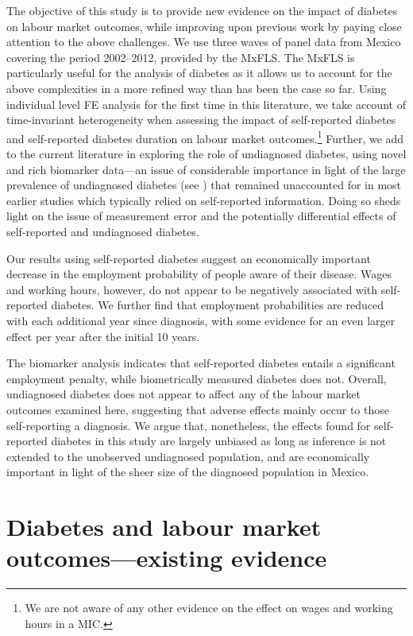 The objective of this study is to provide new evidence on the impact of diabetes on labour market outcomes, while improving upon previous work by paying close attention to the above challenges. We use three waves of panel data from Mexico covering the period 2002--2012, provided by the \acf{MxFLS}. The \ac{MxFLS} is particularly useful for the analysis of diabetes as it allows us to account for the above complexities in a more refined way than has been the case so far. Using individual level \ac{FE} analysis for the first time in this literature, we take account of time-invariant heterogeneity when assessing the impact of self-reported diabetes and self-reported diabetes duration on labour market outcomes.\footnote{We are not aware of any other evidence on the effect on wages and working hours in a \ac{MIC}.} Further, we add to the current literature in exploring the role of undiagnosed diabetes, using novel and rich biomarker data---an issue of considerable importance in light of the large prevalence of undiagnosed diabetes (see \textcite{Beagley2014}) that remained unaccounted for in most earlier studies which typically relied on self-reported information. Doing so sheds light on the issue of measurement error and the potentially differential effects of self-reported and undiagnosed diabetes. 

Our results using self-reported diabetes suggest an economically important decrease in the employment probability of people aware of their disease. Wages and working hours, however, do not appear to be negatively associated with self-reported diabetes. We further find that employment probabilities are reduced with each additional year since diagnosis, with some evidence for an even larger effect per year after the initial 10 years. 

The biomarker analysis indicates that self-reported diabetes entails a significant employment penalty, while biometrically measured diabetes does not. Overall, undiagnosed diabetes does not appear to affect any of the labour market outcomes examined here, suggesting that adverse effects mainly occur to those self-reporting a diagnosis. We argue that, nonetheless, the effects found for self-reported diabetes in this study are largely unbiased as long as inference is not extended to the unobserved undiagnosed population, and are economically important in light of the sheer size of the diagnosed population in Mexico.


\section{\label{sec:labour  outcomes and diabetes literature}Diabetes and labour market outcomes---existing evidence}


